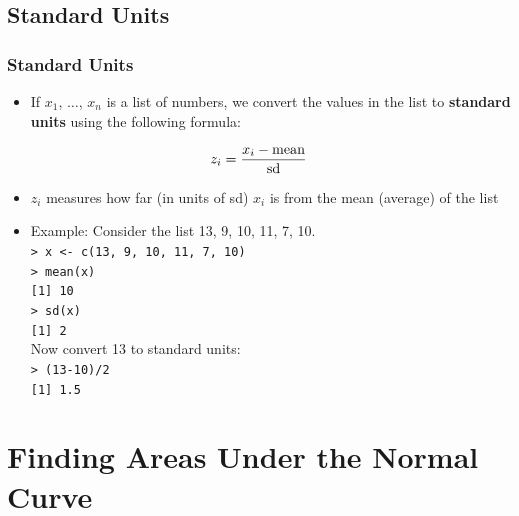 \documentclass[t]{beamer}
\begin{document}
\subsection{Standard Units}
\begin{frame}[t]\frametitle{Standard Units}
{\small

\begin{itemize}
\item If $x_1$, $\dots$, $x_n$ is a list of numbers, we convert the values
in the list to {\color{blue}\textbf{standard units}} using the following formula:
\vspace{-5pt}
\end{itemize}
\[z_i = \frac{x_i - \mbox{mean}}{\mbox{sd}}\vspace{-12pt}\]
\begin{itemize}
\item $z_i$ measures how far (in units of sd) $x_i$ is from the mean (average) of the list
\item Example:  Consider the list 13, 9, 10, 11, 7, 10.\\
   \texttt{> x <- c(13, 9, 10, 11, 7, 10)}\\
   \texttt{> mean(x)}\\
   \texttt{[1] 10}\\
   \texttt{> sd(x)}\\
   \texttt{[1] 2}\\[5pt]
   Now convert 13 to standard units:\\
   \texttt{> (13-10)/2}\\
   \texttt{[1] 1.5}\\
\end{itemize}
}

\end{frame}

\section[Areas]{Finding Areas Under the Normal Curve}
\end{document}
